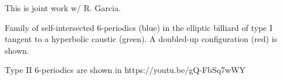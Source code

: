 This is joint work w/ R. Garcia.

Family of self-intersected 6-periodics (blue) in the elliptic billiard of type I tangent to a hyperbolic caustic (green). A doubled-up configuration (red) is shown.

Type II 6-periodics are shown in https://youtu.be/gQ-FbSq7wWY